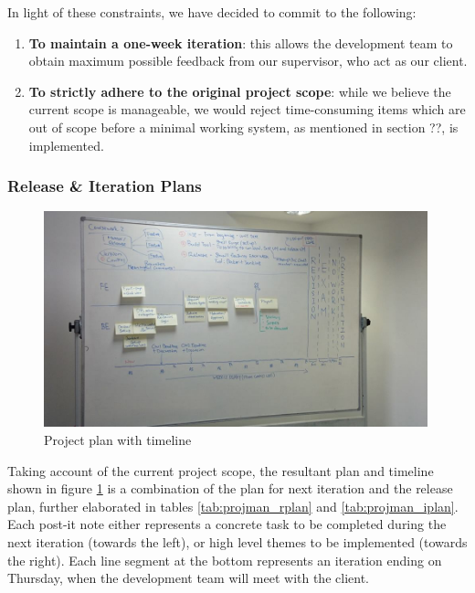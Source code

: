 \documentclass[a4paper, titlepage]{article}
\begin{document}
In light of these constraints, we have decided to commit to the following:
\begin{enumerate}
  \item \textbf{To maintain a one-week iteration}: this allows the development team to
        obtain maximum possible feedback from our supervisor, who act as our client.
  \item \textbf{To strictly adhere to the original project scope}: while we believe the
        current scope is manageable, we would reject time-consuming items which
        are out of scope before a minimal working system, as mentioned in section ??, is implemented.
\end{enumerate}

\subsubsection{Release \& Iteration Plans}

\begin{figure}[h]
  \centering
    \includegraphics[width = 0.99\textwidth]{./projman/timeline.jpg}
  \caption{Project plan with timeline}
  \label{fig:projman_timeline}
\end{figure}


Taking account of the current project scope, the resultant plan and timeline shown in figure 
\ref{fig:projman_timeline} is a
combination of the plan for next iteration and the release plan, further elaborated in tables 
\ref{tab:projman_rplan} and \ref{tab:projman_iplan}. Each post-it note either represents a 
concrete task to be completed during the next iteration (towards the left), or
high level themes to be implemented (towards the right). Each line segment at
the bottom represents an iteration ending on Thursday, when the development
team will meet with the client.
\end{document}
